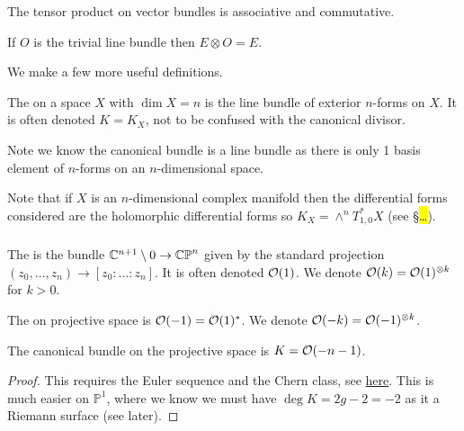 \documentclass{article}
\begin{document}
\begin{lemma}
	The tensor product on vector bundles is associative and commutative. 
\end{lemma}

\begin{lemma}
	If $O$ is the trivial line bundle then $E\otimes O = E$. 
\end{lemma}


We make a few more useful definitions. 



\begin{definition}
	The  on a space $X$ with $\dim X = n$ is the line bundle of exterior $n$-forms on $X$. It is often denoted $K=K_X$, not to be confused with the canonical divisor.
\end{definition}
\begin{remark}
	Note we know the canonical bundle is a line bundle as there is only 1 basis element of $n$-forms on an $n$-dimensional space. 
\end{remark}
\begin{remark}
	Note that if $X$ is an $n$-dimensional complex manifold then the differential forms considered are the holomorphic differential forms so $K_X = \wedge^n T^\ast_{1,0}X$ (see \S \hl{\dots}). 
\end{remark}

\subsubsection{}

\begin{definition}
The  is the bundle $\mathbb{C}^{n+1}\setminus 0 \to \mathbb{CP}^n$ given by the standard projection $(z_0, \dots, z_n) \to [z_0: \dots : z_n]$. It is often denoted $\mathcal{O}(1)$.  We denote $\mathcal{O}(k) = \mathcal{O}(1)^{\otimes k}$ for $k>0$.
\end{definition}

\begin{definition}
The  on projective space is $\mathcal{O}(-1) = \mathcal{O}(1)^\ast$. We denote $\mathcal{O}(-k) = \mathcal{O}(-1)^{\otimes k}$. 
\end{definition}

\begin{prop}
The canonical bundle on the projective space is $K = \mathcal{O}(-n-1)$. 
\end{prop}
\begin{proof}
	This requires the Euler sequence and the Chern class, see \href{https://mathoverflow.net/questions/176639/canonical-sheaf-of-projective-space}{here}. This is much easier on $\mathbb{P}^1$, where we know we must have $\deg K = 2g-2 = -2$ as it a Riemann surface (see later).  
\end{proof}
\end{document}
